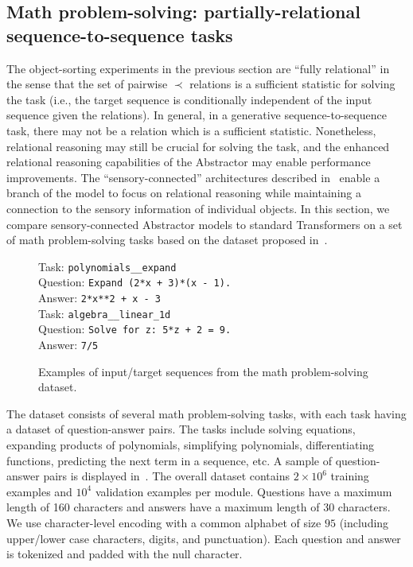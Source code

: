 \subsection{Math problem-solving: partially-relational sequence-to-sequence tasks}\label{ssec:experiments_math}

The object-sorting experiments in the previous section are ``fully relational'' in the sense that the set of pairwise $\prec$ relations is a sufficient statistic for solving the task (i.e., the target sequence is conditionally independent of the input sequence given the relations). In general, in a generative sequence-to-sequence task, there may not be a relation which is a sufficient statistic. Nonetheless, relational reasoning may still be crucial for solving the task, and the enhanced relational reasoning capabilities of the Abstractor may enable performance improvements. The ``sensory-connected'' architectures described in~ enable a branch of the model to focus on relational reasoning while maintaining a connection to the sensory information of individual objects. In this section, we compare sensory-connected Abstractor models to standard Transformers on a set of math problem-solving tasks based on the dataset proposed in~\citep{saxtonAnalyzingMathematicalReasoning2019}.

\begin{figure}
    \begin{minipage}{0.5\textwidth}
        Task: \texttt{polynomials\_\_expand}\\
        Question: \texttt{Expand (2*x + 3)*(x - 1).}\\
        Answer: \texttt{2*x**2 + x - 3}\\

        Task: \texttt{algebra\_\_linear\_1d}\\
        Question: \texttt{Solve for z: 5*z + 2 = 9.}\\
        Answer: \texttt{7/5}\\
    \end{minipage}
\caption{Examples of input/target sequences from the math problem-solving dataset.}\label{fig:math_dataset}
\end{figure}

The dataset consists of several math problem-solving tasks, with each task having a dataset of question-answer pairs. The tasks include solving equations, expanding products of polynomials, simplifying polynomials, differentiating functions, predicting the next term in a sequence, etc. A sample of question-answer pairs is displayed in~. The overall dataset contains $2 \times 10^6$ training examples and $10^4$ validation examples per module. Questions have a maximum length of 160 characters and answers have a maximum length of 30 characters. We use character-level encoding with a common alphabet of size $95$ (including upper/lower case characters, digits, and punctuation). Each question and answer is tokenized and padded with the null character.

